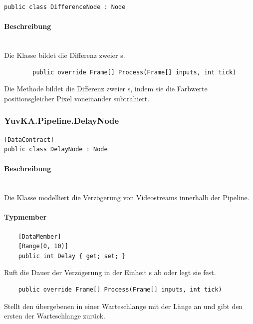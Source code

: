 \begin{verbatim}
public class DifferenceNode : Node
\end{verbatim}

\paragraph{Beschreibung}~\\
Die Klasse  bildet die Differenz zweier s.

\begin{itemize}
	\begin{verbatim}
		public override Frame[] Process(Frame[] inputs, int tick)
	\end{verbatim}
Die Methode  bildet die Differenz zweier s, indem sie die Farbwerte positionsgleicher Pixel voneinander subtrahiert.

\end{itemize}

\subsubsection{YuvKA.Pipeline.DelayNode}

\begin{verbatim}
[DataContract]
public class DelayNode : Node
\end{verbatim}

\paragraph{Beschreibung}~\\
Die Klasse  modelliert die Verzögerung von Videostreams innerhalb der Pipeline.

\paragraph{Typmember}
\begin{itemize}
	
	\begin{verbatim}
	[DataMember]
	[Range(0, 10)]
	public int Delay { get; set; }
	\end{verbatim}
	Ruft die Dauer der Verzögerung in der Einheit s ab oder legt sie fest.

	\begin{verbatim}
	public override Frame[] Process(Frame[] inputs, int tick)
	\end{verbatim}
	Stellt den übergebenen  in einer Warteschlange mit der Länge  an und gibt den ersten  der Warteschlange zurück.
	
\end{itemize}

